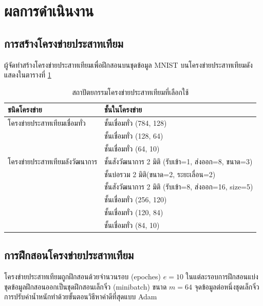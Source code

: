 \section{ผลการดำเนินงาน}

\subsection{การสร้างโครงข่ายประสาทเทียม}

ผู้จัดทำสร้างโครงข่ายประสาทเทียมเพื่อฝึกสอนบนชุดข้อมูล MNIST \cite{726791} บนโครงข่ายประสาทเทียมดังแสดงในตารางที่ \ref{network-archs}

\begin{table}[]
    \centering
    \begin{tabular}{ll}
        \hline
        \textbf{ชนิดโครงข่าย} & \textbf{ชั้นในโครงข่าย}\\
        \hline
        โครงข่ายประสาทเทียมเชื่อมทั่ว                 & ชั้นเชื่อมทั่ว (784, 128)   \\
                              & ชั้นเชื่อมทั่ว (128, 64)    \\
                              & ชั้นเชื่อมทั่ว (64, 10)     \\
        โครงข่ายประสาทเทียมลังวัฒนาการ                   & ชั้นสังวัฒนาการ 2 มิติ (รับเข้า=1, ส่งออก=8, ขนาด=3) \\
                              & ชั้นบ่อรวม 2 มิติ(ขนาด=2, ระยะเลื่อน=2)  \\
                              & ชั้นสังวัฒนาการ 2 มิติ (รับเข้า=8, ส่งออก=16, size=5)\\
                              & ชั้นเชื่อมทั่ว (256, 120)   \\
                              & ชั้นเชื่อมทั่ว (120, 84)    \\
                              & ชั้นเชื่อมทั่ว (84, 10)     \\
        \hline
    \end{tabular}
    \caption{สถาปัตยกรรมโครงข่ายประสาทเทียมที่เลือกใช้}
    \label{network-archs}
\end{table}

\subsection{การฝึกสอนโครงข่ายประสาทเทียม}

โครงข่ายประสาทเทียมถูกฝึกสอนด้วยจำนวนรอบ (epoches)  $e=10$ ในแต่ละรอบการฝึกสอนแบ่งชุดข้อมูลฝึกสอนออกเป็นชุดฝึกสอนเล็กจิ๋ว (minibatch) ขนาด $m = 64$ จุดข้อมูลต่อหนึ่งชุดเล็กจิ๋ว การปรับค่าน้ำหนักทำด้วยขั้นตอนวิธีหาค่าดีที่สุดแบบ Adam \cite{kingma2014adam}

